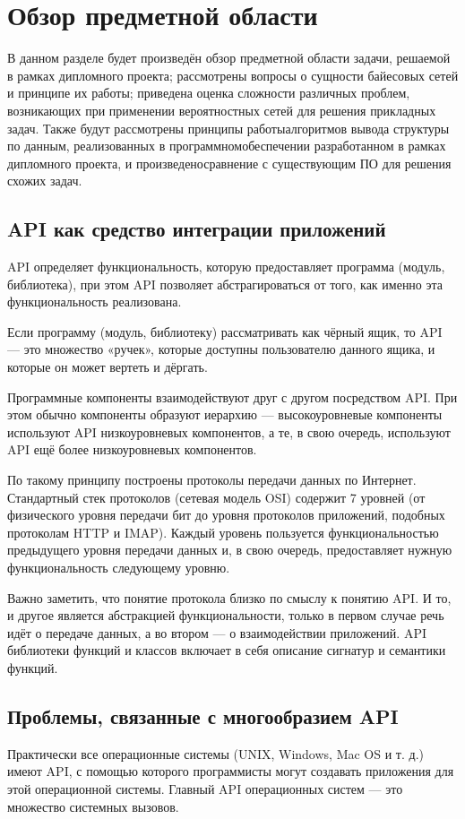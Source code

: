\section{Обзор предметной области}
В данном разделе будет произведён обзор предметной области задачи, решаемой в рамках дипломного проекта; рассмотрены вопросы о сущности
байесовых сетей и принципе их работы; приведена оценка сложности различных проблем, возникающих при применении вероятностных сетей для
решения прикладных задач. Также будут рассмотрены принципы работыалгоритмов вывода структуры по данным, реализованных
в программномобеспечении разработанном в рамках дипломного проекта, и произведеносравнение с существующим ПО для решения схожих задач.

\subsection{API как средство интеграции приложений}
API определяет функциональность, которую предоставляет программа (модуль, библиотека), при этом API позволяет абстрагироваться от того, как именно эта функциональность реализована.

Если программу (модуль, библиотеку) рассматривать как чёрный ящик, то API — это множество «ручек», которые доступны пользователю данного ящика, и которые он может вертеть и дёргать.

Программные компоненты взаимодействуют друг с другом посредством API. При этом обычно компоненты образуют иерархию — высокоуровневые компоненты используют API низкоуровневых компонентов, а те, в свою очередь, используют API ещё более низкоуровневых компонентов.

По такому принципу построены протоколы передачи данных по Интернет. Стандартный стек протоколов (сетевая модель OSI) содержит 7 уровней (от физического уровня передачи бит до уровня протоколов приложений, подобных протоколам HTTP и IMAP). Каждый уровень пользуется функциональностью предыдущего уровня передачи данных и, в свою очередь, предоставляет нужную функциональность следующему уровню.

Важно заметить, что понятие протокола близко по смыслу к понятию API. И то, и другое является абстракцией функциональности, только в первом случае речь идёт о передаче данных, а во втором — о взаимодействии приложений.
API библиотеки функций и классов включает в себя описание сигнатур и семантики функций.


\subsection{Проблемы, связанные с многообразием API}
Практически все операционные системы (UNIX, Windows, Mac OS и т. д.) имеют API, с помощью которого программисты могут создавать приложения для этой операционной системы. Главный API операционных систем — это множество системных вызовов.

